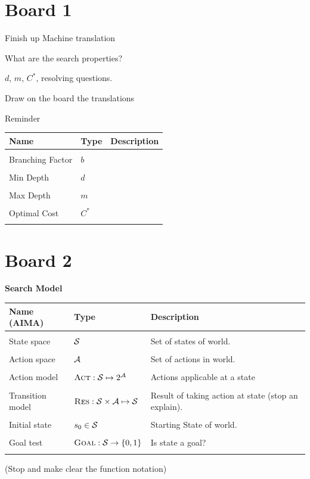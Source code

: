 \documentclass[10pt]{article}
\begin{document}
\MakeScribeTop{}


\section{Board 1}

Finish up Machine translation 

What are the search properties? 

$d$, $m$, $C^*$, resolving questions.

Draw on the board the translations

Reminder 

\air
\begin{center}
\begin{tabularx}{\linewidth}{llX}
  \toprule
  Name  & Type & Description \\
  \midrule
\\
 Branching Factor & $b$ & \censor{}  \\\\
 Min Depth &  $d$ & \censor{} \\\\
 Max Depth & $m$& \censor{} \\\\
 Optimal Cost & $C^*$& \censor{} \\\\
 \bottomrule
\end{tabularx}
\end{center}




\section{Board 2}
 \air
\textbf{Search Model}
\begin{center}
\begin{tabularx}{\linewidth}{llX}
  \toprule
  Name (AIMA) & Type & Description \\
  \midrule
\\
 State space & $\mathcal{S}$ & Set of states of world. \\\\
 Action space & $\mathcal{A}$& Set of actions in world. \\\\
 Action model&  $\mathrm{\textsc{Act}}: \mathcal{S} \mapsto 2^{\mathcal{A}}$ & Actions applicable at a state \\\\
 Transition model&  $\mathrm{\textsc{Res}}:  \mathcal{S} \times \mathcal{A} \mapsto \mathcal{S} $ &   Result of taking action at state (stop an explain).  \\\\
 Initial state &  $s_0 \in \mathcal{S}$ & Starting State of world.  \\\\
 Goal test& $\mathrm{\textsc{Goal}}: \mathcal{S} \rightarrow \{0, 1\}$ & Is state a goal? \\\\
 \bottomrule
\end{tabularx}
\end{center}
(Stop and make clear the function notation)
\end{document}
